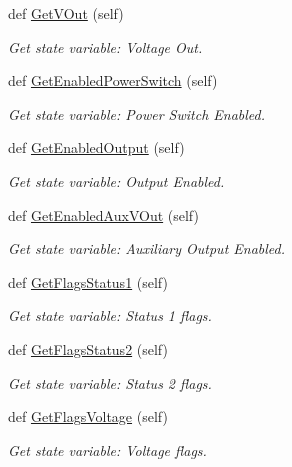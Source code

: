 \begin{DoxyCompactItemize}
def \hyperlink{class_mini_box_d_c_d_c_1_1_dc_dc_converter_1_1_dc_dc_converter_a1c3d70cb7dd253d4986b7cccd5a15b5e}{Get\+V\+Out} (self)
\begin{DoxyCompactList}\small\item\em Get state variable\+: Voltage Out. \end{DoxyCompactList}\item 
def \hyperlink{class_mini_box_d_c_d_c_1_1_dc_dc_converter_1_1_dc_dc_converter_a9f543016f350bf4eab819d9a23091e2f}{Get\+Enabled\+Power\+Switch} (self)
\begin{DoxyCompactList}\small\item\em Get state variable\+: Power Switch Enabled. \end{DoxyCompactList}\item 
def \hyperlink{class_mini_box_d_c_d_c_1_1_dc_dc_converter_1_1_dc_dc_converter_aac3e634377f110a6a493b45075114920}{Get\+Enabled\+Output} (self)
\begin{DoxyCompactList}\small\item\em Get state variable\+: Output Enabled. \end{DoxyCompactList}\item 
def \hyperlink{class_mini_box_d_c_d_c_1_1_dc_dc_converter_1_1_dc_dc_converter_afba56921c300608667b22030f90e8494}{Get\+Enabled\+Aux\+V\+Out} (self)
\begin{DoxyCompactList}\small\item\em Get state variable\+: Auxiliary Output Enabled. \end{DoxyCompactList}\item 
def \hyperlink{class_mini_box_d_c_d_c_1_1_dc_dc_converter_1_1_dc_dc_converter_adc2fb5f72b091473bb185ee4fe2feb8a}{Get\+Flags\+Status1} (self)
\begin{DoxyCompactList}\small\item\em Get state variable\+: Status 1 flags. \end{DoxyCompactList}\item 
def \hyperlink{class_mini_box_d_c_d_c_1_1_dc_dc_converter_1_1_dc_dc_converter_a7ec4c52f29bb150663d9346a87ed8c12}{Get\+Flags\+Status2} (self)
\begin{DoxyCompactList}\small\item\em Get state variable\+: Status 2 flags. \end{DoxyCompactList}\item 
def \hyperlink{class_mini_box_d_c_d_c_1_1_dc_dc_converter_1_1_dc_dc_converter_a0c527b680bbdcb54d903c40d2e79e06d}{Get\+Flags\+Voltage} (self)
\begin{DoxyCompactList}\small\item\em Get state variable\+: Voltage flags. \end{DoxyCompactList}\item 

\end{DoxyCompactItemize}
